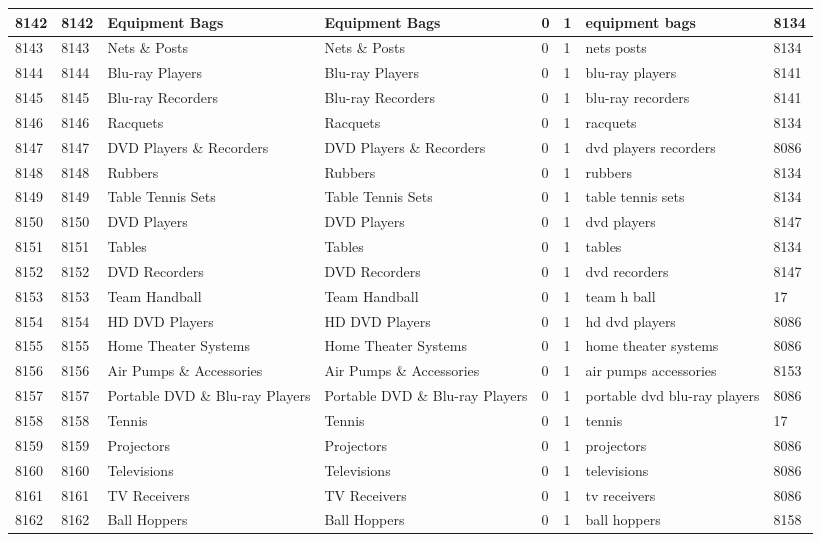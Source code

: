 \begin{longtable}{|l|l|l|l|l|l|l|l|}
8142 & 8142 & Equipment Bags & Equipment Bags & 0 & 1 & equipment bags & 8134 \\ \hline 
8143 & 8143 & Nets \& Posts & Nets \& Posts & 0 & 1 & nets posts & 8134 \\ \hline 
8144 & 8144 & Blu-ray Players & Blu-ray Players & 0 & 1 & blu-ray players & 8141 \\ \hline 
8145 & 8145 & Blu-ray Recorders & Blu-ray Recorders & 0 & 1 & blu-ray recorders & 8141 \\ \hline 
8146 & 8146 & Racquets & Racquets & 0 & 1 & racquets & 8134 \\ \hline 
8147 & 8147 & DVD Players \& Recorders & DVD Players \& Recorders & 0 & 1 & dvd players recorders & 8086 \\ \hline 
8148 & 8148 & Rubbers & Rubbers & 0 & 1 & rubbers & 8134 \\ \hline 
8149 & 8149 & Table Tennis Sets & Table Tennis Sets & 0 & 1 & table tennis sets & 8134 \\ \hline 
8150 & 8150 & DVD Players & DVD Players & 0 & 1 & dvd players & 8147 \\ \hline 
8151 & 8151 & Tables & Tables & 0 & 1 & tables & 8134 \\ \hline 
8152 & 8152 & DVD Recorders & DVD Recorders & 0 & 1 & dvd recorders & 8147 \\ \hline 
8153 & 8153 & Team Handball & Team Handball & 0 & 1 & team h ball & 17 \\ \hline 
8154 & 8154 & HD DVD Players & HD DVD Players & 0 & 1 & hd dvd players & 8086 \\ \hline 
8155 & 8155 & Home Theater Systems & Home Theater Systems & 0 & 1 & home theater systems & 8086 \\ \hline 
8156 & 8156 & Air Pumps \& Accessories & Air Pumps \& Accessories & 0 & 1 & air pumps accessories & 8153 \\ \hline 
8157 & 8157 & Portable DVD \& Blu-ray Players & Portable DVD \& Blu-ray Players & 0 & 1 & portable dvd blu-ray players & 8086 \\ \hline 
8158 & 8158 & Tennis & Tennis & 0 & 1 & tennis & 17 \\ \hline 
8159 & 8159 & Projectors & Projectors & 0 & 1 & projectors & 8086 \\ \hline 
8160 & 8160 & Televisions & Televisions & 0 & 1 & televisions & 8086 \\ \hline 
8161 & 8161 & TV Receivers & TV Receivers & 0 & 1 & tv receivers & 8086 \\ \hline 
8162 & 8162 & Ball Hoppers & Ball Hoppers & 0 & 1 & ball hoppers & 8158 \\ \hline 

\end{longtable}

